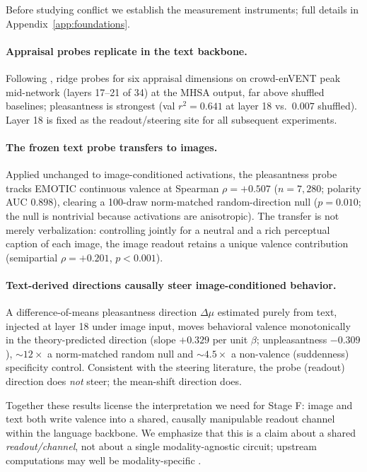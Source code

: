 \documentclass{article}
\begin{document}
Before studying conflict we establish the measurement instruments; full details in Appendix~\ref{app:foundations}.

\paragraph{Appraisal probes replicate in the text backbone.}
Following \citet{tak2025}, ridge probes for six appraisal dimensions on crowd-enVENT peak mid-network (layers 17--21 of 34) at the MHSA output, far above shuffled baselines; pleasantness is strongest (val $r^2 = 0.641$ at layer 18 vs.\ $0.007$ shuffled). Layer 18 is fixed as the readout/steering site for all subsequent experiments.

\paragraph{The frozen text probe transfers to images.}
Applied unchanged to image-conditioned activations, the pleasantness probe tracks EMOTIC continuous valence at Spearman $\rho = +0.507$ ($n{=}7{,}280$; polarity AUC $0.898$), clearing a 100-draw norm-matched random-direction null ($p{=}0.010$; the null is nontrivial because activations are anisotropic). The transfer is not merely verbalization: controlling jointly for a neutral and a rich perceptual caption of each image, the image readout retains a unique valence contribution (semipartial $\rho = +0.201$, $p{<}0.001$).

\paragraph{Text-derived directions causally steer image-conditioned behavior.}
A difference-of-means pleasantness direction $\Delta\mu$ estimated purely from text, injected at layer 18 under image input, moves behavioral valence monotonically in the theory-predicted direction (slope $+0.329$ per unit $\beta$; unpleasantness $-0.309$), ${\sim}12\times$ a norm-matched random null and ${\sim}4.5\times$ a non-valence (suddenness) specificity control. Consistent with the steering literature, the probe (readout) direction does \emph{not} steer; the mean-shift direction does.

Together these results license the interpretation we need for Stage F: image and text both write valence into a shared, causally manipulable readout channel within the language backbone. We emphasize that this is a claim about a shared \emph{readout/channel}, not about a single modality-agnostic circuit; upstream computations may well be modality-specific \citep{nikankin2025}.
\end{document}
